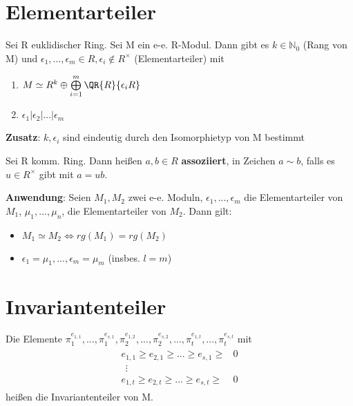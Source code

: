 \section{Elementarteiler}
\begin{theorem}
Sei R euklidischer Ring. Sei M ein e-e. R-Modul. Dann gibt es $k \in \mathbb{N}_0$ (Rang von M) und $\epsilon_1,...,\epsilon_m \in R, \epsilon_i \notin R^\times$ (Elementarteiler) mit
\begin{enumerate}
	\item $M \simeq R^k \oplus \bigoplus \limits_{i=1}^m \QR{R}{\epsilon_i R}$
	\item $\epsilon_1 | \epsilon_2 | ... | \epsilon_m$
\end{enumerate}
\textbf{Zusatz}: $k,\epsilon_i$ sind eindeutig durch den Isomorphietyp von M bestimmt
\end{theorem}
\begin{remark}
Sei R komm. Ring. Dann heißen $a,b \in R$ \textbf{assoziiert}, in Zeichen $a \sim b$, falls es $u \in R^\times$ gibt mit $a=ub$.

\textbf{Anwendung}: Seien $M_1,M_2$ zwei e-e. Moduln, $\epsilon_1,...,\epsilon_m$ die Elementarteiler von $M_1$, $\mu_1,...,\mu_n$, die Elementarteiler von $M_2$. Dann gilt:
\begin{itemize}
	\item $M_1 \simeq M_2 \Leftrightarrow rg(M_1) = rg(M_2)$
	\item $\epsilon_1 = \mu_1,...,\epsilon_m = \mu_m$ (insbes. $l=m$) %
\end{itemize}
\end{remark}

\section{Invariantenteiler}
\begin{definition}
Die Elemente $\pi_1^{e_{1,1}},...,\pi_1^{e_{s,1}},\pi_2^{e_{1,2}},...,\pi_2^{e_{s,2}},...,\pi_t^{e_{1,t}},...,\pi_t^{e_{s,t}}$ mit 
\begin{align*}
\begin{array}{ll}
e_{1,1} \geq e_{2,1} \geq ... \geq e_{s,1} \geq & 0 \\ 
~~\vdots & \\ 
e_{1,t} \geq e_{2,t} \geq ... \geq e_{s,t} \geq & 0
\end{array} 
\end{align*}
heißen die Invariantenteiler von M.
\end{definition}
